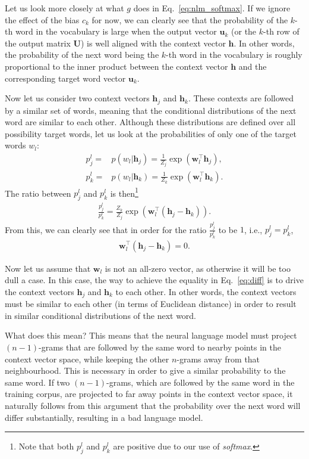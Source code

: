 \documentclass{report}
\newcommand{\vect}[1]{\mathbf{#1}}
\newcommand{\matr}[1]{\mathbf{#1}}
\newcommand{\vh}[0]{\vect{h}}
\newcommand{\vw}[0]{\vect{w}}
\newcommand{\vu}[0]{\vect{u}}
\newcommand{\mU}[0]{\matr{U}}
\begin{document}
Let us look more closely at what $g$ does in Eq.~\eqref{eq:nlm_softmax}. If we
ignore the effect of the bias $c_k$ for now, we can clearly see that the
probability of the $k$-th word in the vocabulary is large when the output vector
$\vu_k$ (or the $k$-th row of the output matrix $\mU$) is well aligned with the
context vector $\vh$. In other words, the probability of the next word being the
$k$-th word in the vocabulary is roughly proportional to the inner product
between the context vector $\vh$ and the corresponding target word vector
$\vu_k$.

Now let us consider two context vectors $\vh_j$ and $\vh_k$. These contexts are
followed by a similar set of words, meaning that the conditional distributions
of the next word are similar to each other. Although these distributions are
defined over all possibility target words, let us look at the probabilities of
only one of the target words $w_l$: 
\begin{align*}
    p_j^l =& p(w_l | \vh_j) = \frac{1}{Z_j} \exp\left( \vw_l^\top \vh_j \right), \\
    p_k^l =& p(w_l | \vh_k) = \frac{1}{Z_k} \exp\left( \vw_l^\top \vh_k \right).
\end{align*}
The ratio between $p_j^l$ and $p_k^l$ is then\footnote{
    Note that both $p_j^l$ and $p_k^l$ are positive due to our use of {\em softmax}.
}
\begin{align*}
    \frac{p_j^l}{p_k^l} = \frac{Z_k}{Z_j} \exp\left( \vw_l^\top (\vh_j -
    \vh_k)\right).
\end{align*}
From this, we can clearly see that in order for the ratio $\tfrac{p_j^l}{p_k^l}$
to be $1$, i.e., $p_j^l = p_k^l$, 
\begin{align}
    \label{eq:diff}
    \vw_l^\top \left(\vh_j - \vh_k\right) = 0.
\end{align}

Now let us assume that $\vw_l$ is not an all-zero vector, as otherwise it will
be too dull a case. In this case, the way to achieve the equality in
Eq.~\eqref{eq:diff} is to drive the context vectors $\vh_j$ and $\vh_k$ to each
other. In other words, the context vectors must be similar to each other (in
terms of Euclidean distance) in order to result in similar conditional
distributions of the next word.

What does this mean? This means that the neural language model must project
$(n-1)$-grams that are followed by the same word to nearby points in the context
vector space, while keeping the other $n$-grams away from that neighbourhood.
This is necessary in order to give a similar probability to the same word. If
two $(n-1)$-grams, which are followed by the same word in the training corpus,
are projected to far away points in the context vector space, it naturally
follows from this argument that the probability over the next word will differ
substantially, resulting in a bad language model.
\end{document}
